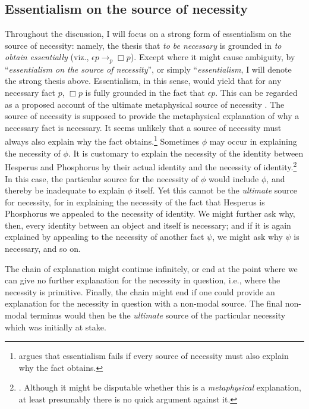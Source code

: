 \documentclass[12pt]{article}
\begin{document}
\subsection{Essentialism on the source of necessity}

Throughout the discussion, I will focus on a strong form of essentialism on the source of necessity: namely, the thesis that \textit{to be necessary} is grounded in \textit{to obtain essentially} (viz., $\epsilon p \bm{\rightarrow}_p \Box p$). Except where it might cause ambiguity, by ``\textit{essentialism on the source of necessity}'', or simply ``\textit{essentialism}, I will denote the strong thesis above. Essentialism, in this sense, would yield that for any necessary fact $p$, $\Box p$ is fully grounded in the fact that $\epsilon p$. This can be regarded as a proposed account of the ultimate metaphysical source of necessity \citep{Hale2002-HALTSO-27}. The source of necessity is supposed to provide the metaphysical explanation of why a necessary fact is necessary. It seems unlikely that a source of necessity must always also explain why the fact obtains.\footnote{\citet{Bovey2022-BOVOTN} argues that essentialism fails if every source of necessity must also explain why the fact obtains.} Sometimes $\phi$ may occur in explaining the necessity of $\phi$. It is customary to explain the necessity of the identity between Hesperus and Phosphorus by their actual identity and the necessity of identity.\footnote{\citet{Kripke1980-KRINAN-12}. Although it might be disputable whether this is a \textit{metaphysical} explanation, at least presumably there is no quick argument against it.} In this case, the particular source for the necessity of $\phi$ would include $\phi$, and thereby be inadequate to explain $\phi$ itself. Yet this cannot be the \textit{ultimate} source for necessity, for in explaining the necessity of the fact that Hesperus is Phosphorus we appealed to the necessity of identity. We might further ask why, then, every identity between an object and itself is necessary; and if it is again explained by appealing to the necessity of another fact $\psi$, we might ask why $\psi$ is necessary, and so on. 
\par
The chain of explanation might continue infinitely, or end at the point where we can give no further explanation for the necessity in question, i.e., where the necessity is primitive. Finally, the chain might end if one could provide an explanation for the necessity in question with a non-modal source. The final non-modal terminus would then be the \textit{ultimate} source of the particular necessity which was initially at stake. 
\end{document}

